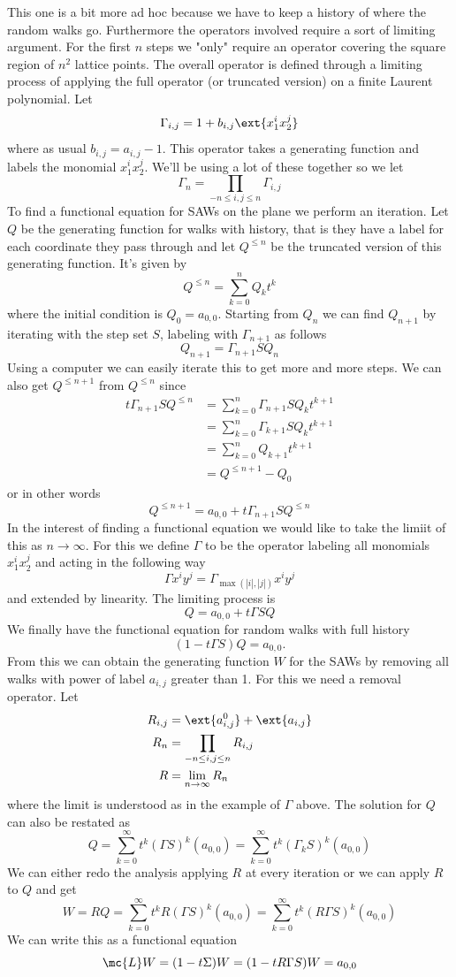 This one is a bit more ad hoc because we have to keep a history of where the random walks go. Furthermore the operators involved require a sort of limiting argument. For the first $n$ steps we "only" require an operator covering the square region of $n^2$ lattice points. The overall operator is defined through a limiting process of applying the full operator (or truncated version) on a finite Laurent polynomial. Let
\[
\Gamma_{i,j} = 1+b_{i,j}\ext{x_1^ix_2^j}
\]
where as usual $b_{i,j} = a_{i,j}-1$. This operator takes a generating function and labels the monomial $x_1^ix_2^j$. We'll be using a lot of these together so we let
\[
\Gamma_n = \prod_{-n\leq i,j\leq n}\Gamma_{i,j}
\]
To find a functional equation for SAWs on the plane we perform an iteration. Let $Q$ be the generating function for walks with history, that is they have a label for each coordinate they pass through and let $Q^{\leq n}$ be the truncated version of this generating function. It's given by
\[
Q^{\leq n} = \sum_{k=0}^{n} Q_k t^k
\]
where the initial condition is $Q_0 = a_{0,0}$. Starting from $Q_n$ we can find $Q_{n+1}$ by iterating with the step set $S$, labeling with $\Gamma_{n+1}$ as follows
\[
	Q_{n+1} = \Gamma_{n+1}SQ_n
\]
Using a computer we can easily iterate this to get more and more steps. We can also get $Q^{\leq n+1}$ from $Q^{\leq n}$ since
\begin{align*}
	t\Gamma_{n+1}SQ^{\leq n} & = \sum_{k=0}^n \Gamma_{n+1}SQ_kt^{k+1}\\
	& = \sum_{k=0}^n \Gamma_{k+1}SQ_kt^{k+1}\\
	& = \sum_{k=0}^n Q_{k+1}t^{k+1}\\
	&= Q^{\leq n+1}-Q_0
\end{align*}
or in other words
\[
	 Q^{\leq n+1} = a_{0,0} + t\Gamma_{n+1}SQ^{\leq n}
\]
In the interest of finding a functional equation we would like to take the limiit of this as $n \to \infty$. For this we define $\Gamma$ to be the operator labeling all monomials $x_1^ix_2^j$ and acting in the following way
\[
	\Gamma x^i y^j = \Gamma_{\max(|i|,|j|)} x^i y^j
\]
and extended by linearity. The limiting process is
\[
	Q = a_{0,0} + t \Gamma SQ
\]
We finally have the functional equation for random walks with full history
\[
	(1 -t\Gamma S)Q = a_{0,0}.
\]
From this we can obtain the generating function $W$ for the SAWs by removing all walks with power of label $a_{i,j}$ greater than 1. For this we need a removal operator. Let
\begin{align*}
	R_{i,j} &= \ext{a_{i,j}^0} + \ext{a_{i,j}}\\
	R_n &= \prod_{-n\leq i,j \leq n} R_{i,j}\\
	R &= \lim_{n\to \infty} R_n
\end{align*}
where the limit is understood as in the example of $\Gamma$ above. The solution for $Q$ can also be restated as
\[
	Q = \sum_{k=0}^{\infty} t^k (\Gamma S)^{k}(a_{0,0}) = \sum_{k=0}^{\infty} t^k (\Gamma_k S)^{k}(a_{0,0}) 
\]
We can either redo the analysis applying $R$ at every iteration or we can apply $R$ to $Q$ and get
\[
	W = RQ = \sum_{k=0}^{\infty} t^k R(\Gamma S)^{k}(a_{0,0}) = \sum_{k=0}^{\infty} t^k (R\Gamma S)^{k}(a_{0,0}) 
\]
We can write this as a functional equation
\[
	\mc{L} W = (1-t\Sigma)W = (1-tR\Gamma S)W = a_{0,0}
\]
